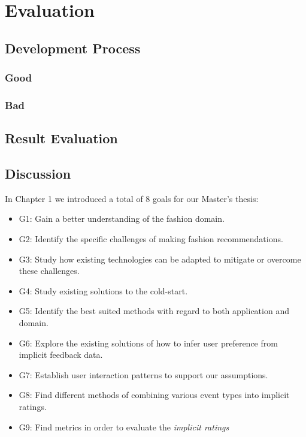 
\chapter{Evaluation}
\label{chap:resulteval}
\minitoc

\clearpage



\section{Development Process}

\subsection*{Good}

\subsection*{Bad}



\section{Result Evaluation}
\label{sec:result-evaluation}


\section{Discussion}

In Chapter 1 we introduced a total of 8 goals for our Master's thesis:

\begin{itemize}
\item G1: Gain a better understanding of the fashion domain.
\item G2: Identify the specific challenges of making fashion recommendations.
\item G3: Study how existing technologies can be adapted to mitigate or
  		  overcome these challenges.
\item G4: Study existing solutions to the cold-start.
\item G5: Identify the best suited methods with regard to both application and domain.
\item G6: Explore the existing solutions of how to infer user preference from implicit feedback data.
\item G7: Establish user interaction patterns to support our assumptions.
\item G8: Find different methods of combining various event types into implicit ratings.
\item G9: Find metrics in order to evaluate the \emph{implicit ratings}
\end{itemize}

